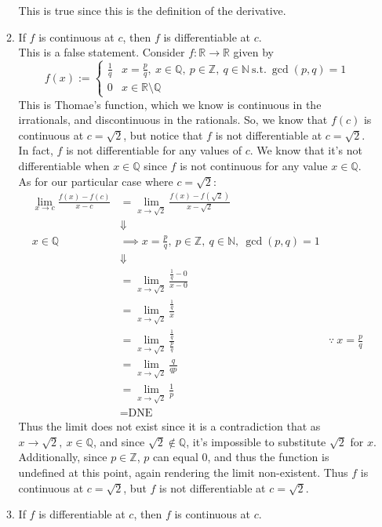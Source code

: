 \documentclass[12pt,letterpaper]{article}
\newcommand{\st}{\ \text{s.t.}\ }
\newcommand{\R}{\mathbb{R}}
\newcommand{\N}{\mathbb{N}}
\newcommand{\Q}{\mathbb{Q}}
\newcommand{\Z}{\mathbb{Z}}
\theoremstyle{case}
\theoremstyle{definition}
\begin{document}
\begin{enumerate}
\begin{enumerate}
			This is true since this is the definition of the derivative.\\
			\item If $f$ is continuous at $c$, then $f$ is differentiable at $c$.\\
			
			This is a false statement. Consider $f:\R \to \R$ given by 
			\[f(x):=\begin{cases}
				\frac{1}{q} & x=\frac{p}{q},\ x \in \Q,\ p \in \Z,\ q \in \N \st \gcd (p,q)=1 \\
				0 & x \in \R \setminus \Q
			\end{cases}\]
			This is Thomae's function, which we know is continuous in the irrationals, and discontinuous in the rationals. So, we know that $f(c)$ is continuous at $c=\sqrt{2}$, but notice that $f$ is not differentiable at $c=\sqrt{2}$. In fact, $f$ is not differentiable for any values of $c$. We know that it's not differentiable when $x \in \Q$ since $f$ is not continuous for any value $x \in \Q$. As for our particular case where $c=\sqrt{2}$:
			\begin{align*}
				\lim\limits_{x \to c} \frac{f(x)-f(c)}{x-c} &= \lim\limits_{x \to \sqrt{2}} \frac{f(x)-f(\sqrt{2})}{x-\sqrt{2}} \\
				&\Downarrow \\
				x \in \Q &\implies x=\frac{p}{q},\  p \in \Z,\ q \in \N,\ \gcd (p,q)=1 \\
				&\Downarrow \\
				&= \lim\limits_{x \to \sqrt{2}} \frac{\frac{1}{q}-0}{x-0} \\
				&= \lim\limits_{x \to \sqrt{2}} \frac{\frac{1}{q}}{x} \\
				&= \lim\limits_{x \to \sqrt{2}} \frac{\frac{1}{q}}{\frac{p}{q}} &\because\ x=\frac{p}{q} \\
				&= \lim\limits_{x \to \sqrt{2}} \frac{q}{qp} \\
				&= \lim\limits_{x \to \sqrt{2}} \frac{1}{p} \\
				&= \text{DNE}
			\end{align*}
			Thus the limit does not exist since it is a contradiction that as $x \to \sqrt{2},\ x \in \Q$, and since $\sqrt{2} \notin \Q$, it's impossible to substitute $\sqrt{2}$ for $x$. Additionally, since $p \in \Z$, $p$ can equal 0, and thus the function is undefined at this point, again rendering the limit non-existent. Thus $f$ is continuous at $c=\sqrt{2}$, but $f$ is not differentiable at $c=\sqrt{2}$.\\
			\item If $f$ is differentiable at $c$, then $f$ is continuous at $c$.\\
			

\end{enumerate}
\end{enumerate}
\end{document}
